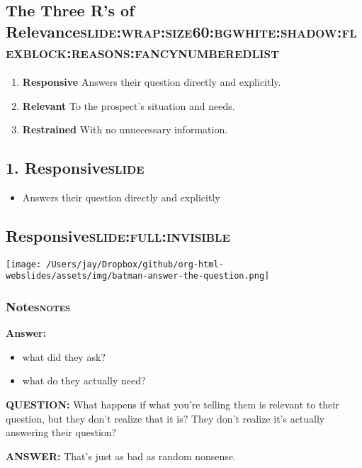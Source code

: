 \documentclass[11pt]{article}
\begin{document}
\subsection{The Three R's of Relevance\hfill{}\textsc{slide:wrap:size60:bgwhite:shadow:flexblock:reasons:fancynumberedlist}}
\label{sec:org51752ce}
\begin{enumerate}
\item \textbf{Responsive} Answers their question directly and explicitly.
\item \textbf{Relevant} To the prospect's situation and needs.
\item \textbf{Restrained} With no unnecessary information.
\end{enumerate}

\subsection{1. Responsive\hfill{}\textsc{slide}}
\label{sec:org75276a2}
\begin{itemize}
\item Answers their question directly and explicitly
\end{itemize}

\subsection{Responsive\hfill{}\textsc{slide:full:invisible}}
\label{sec:org7552ead}
\begin{center}
\texttt{[image: /Users/jay/Dropbox/github/org-html-webslides/assets/img/batman-answer-the-question.png]}
\end{center}

\subsubsection{Notes\hfill{}\textsc{notes}}
\label{sec:org87df891}
\textbf{Answer:}
\begin{itemize}
\item what did they ask?
\item what do they actually need?
\end{itemize}

\textbf{QUESTION:} What happens if what you're telling them is relevant to their question, but they don't realize that it is? They don't realize it's actually answering their question?

\textbf{ANSWER:} That's just as bad as random nonsense.
\end{document}
